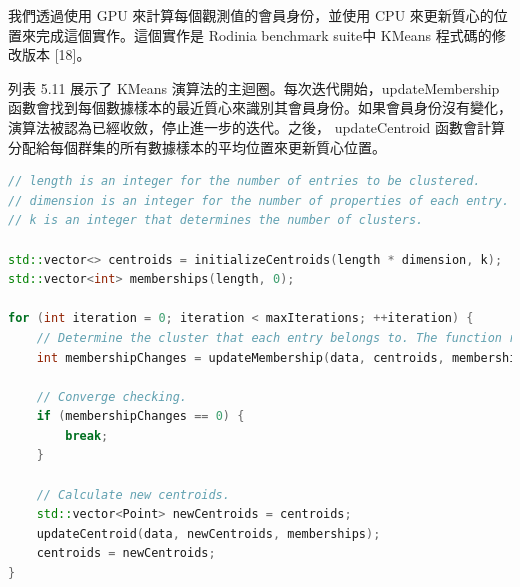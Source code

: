 \vspace{1em}
我們透過使用 GPU 來計算每個觀測值的會員身份，並使用 CPU 來更新質心的位置來完成這個實作。這個實作是  Rodinia benchmark
suite中 KMeans 程式碼的修改版本 [18]。

\vspace{1em}
列表 5.11 展示了 KMeans 演算法的主迴圈。每次迭代開始，updateMembership 函數會找到每個數據樣本的最近質心來識別其會員身份。如果會員身份沒有變化，演算法被認為已經收斂，停止進一步的迭代。之後， updateCentroid 函數會計算分配給每個群集的所有數據樣本的平均位置來更新質心位置。

\lstset{style=mystyle}
\begin{lstlisting}[language=c++,caption={KMeans 的主迴圈}]
// length is an integer for the number of entries to be clustered.
// dimension is an integer for the number of properties of each entry.
// k is an integer that determines the number of clusters.

std::vector<> centroids = initializeCentroids(length * dimension, k);
std::vector<int> memberships(length, 0);

for (int iteration = 0; iteration < maxIterations; ++iteration) {
    // Determine the cluster that each entry belongs to. The function returns how many entries changed membership.
    int membershipChanges = updateMembership(data, centroids, memberships);

    // Converge checking.
    if (membershipChanges == 0) {
        break;
    }

    // Calculate new centroids.
    std::vector<Point> newCentroids = centroids;
    updateCentroid(data, newCentroids, memberships);
    centroids = newCentroids;
}

\end{lstlisting}


